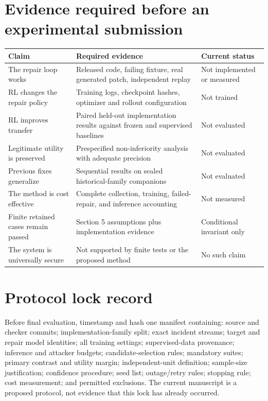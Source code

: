 \documentclass[11pt,a4paper]{article}
\begin{document}
\clearpage
\appendix
{}\section{Evidence required before an experimental submission}
\begingroup\small
\begin{longtable}{>{\raggedright\arraybackslash}p{}>{\raggedright\arraybackslash}p{}>{\raggedright\arraybackslash}p{}}
\toprule
\textbf{Claim} & \textbf{Required evidence} & \textbf{Current status} \\
\midrule
\endhead
The repair loop works & Released code, failing fixture, real generated patch, independent replay & Not implemented or measured \\
RL changes the repair policy & Training logs, checkpoint hashes, optimizer and rollout configuration & Not trained \\
RL improves transfer & Paired held-out implementation results against frozen and supervised baselines & Not evaluated \\
Legitimate utility is preserved & Prespecified non-inferiority analysis with adequate precision & Not evaluated \\
Previous fixes generalize & Sequential results on sealed historical-family companions & Not evaluated \\
The method is cost effective & Complete collection, training, failed-repair, and inference accounting & Not measured \\
Finite retained cases remain passed & Section 5 assumptions plus implementation evidence & Conditional invariant only \\
The system is universally secure & Not supported by finite tests or the proposed method & No such claim \\
\bottomrule
\end{longtable}
\endgroup
{}\section{Protocol lock record}
Before final evaluation, timestamp and hash one manifest containing: source and checker commits; implementation-family split; exact incident streams; target and repair model identities; all training settings; supervised-data provenance; inference and attacker budgets; candidate-selection rules; mandatory suites; primary contrast and utility margin; independent-unit definition; sample-size justification; confidence procedure; seed list; outage/retry rules; stopping rule; cost measurement; and permitted exclusions. The current manuscript is a proposed protocol, not evidence that this lock has already occurred.
\end{document}
